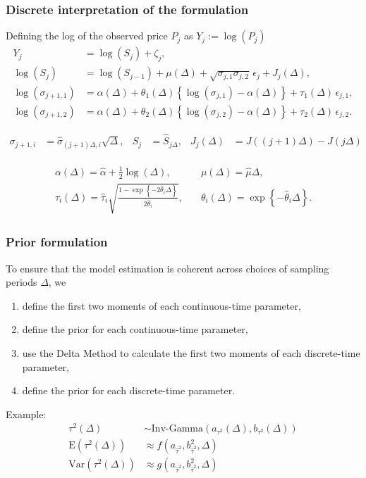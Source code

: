 \documentclass{beamer}
\newcommand{\halpha}{\hat{\alpha}}
\begin{document}
\begin{frame}
  \frametitle{Discrete interpretation of the formulation}
  Defining the log of the observed price $P_j$ as $Y_j := \log(P_j)$
  \begin{align*}
    Y_j &= \log(S_j) + \zeta_j  ,\\
    \log(S_{j}) &= \log(S_{j-1}) + \mu(\Delta) + \sqrt{\sigma_{j,1}\sigma_{j,2}} \, \epsilon_{j} + J_j(\Delta)   ,  \\
    \log(\sigma_{j+1,1}) &= \alpha(\Delta) + \theta_1(\Delta) \left\{ \log(\sigma_{j,1}) - \alpha(\Delta) \right\} + \tau_1(\Delta) \, \epsilon_{j,1}    ,  \\
    \log(\sigma_{j+1,2}) &= \alpha(\Delta) + \theta_2(\Delta) \left\{ \log(\sigma_{j,2}) - \alpha(\Delta) \right\} + \tau_2(\Delta) \, \epsilon_{j,2}.
  \end{align*}

  \begin{align*}
  \sigma_{j+1,i} &= \hat{\sigma}_{(j+1)\Delta,i}\sqrt{\Delta}, & S_j &= \hat{S}_{j\Delta}, & J_j(\Delta) &= J((j+1)\Delta) - J(j\Delta)
  \end{align*}
  
\begin{align*}
  \begin{split}
    \alpha(\Delta) = \halpha + \frac{1}{2}\log(\Delta),\quad  & 
    \mu(\Delta) = \hat{\mu} \Delta,      \\
    \tau_i(\Delta) = \hat{\tau}_i \sqrt{ \frac{1 - \exp \left\{
          -2\hat{\theta}_i \Delta \right\}}{2\hat{\theta}_i } },\quad & \theta_i(\Delta) =
    \exp\left\{
      -\hat{\theta}_i \Delta \right\}.
    \end{split}
\end{align*}
\end{frame}
\begin{frame}
  \frametitle{Prior formulation} To ensure that the model estimation
  is coherent across choices of sampling periods $\Delta$, we
  
  \begin{enumerate}
  \item define the first two moments of each continuous-time parameter,
  \item define the prior for each continuous-time parameter,
  \item use the Delta Method to calculate the first two moments of each discrete-time parameter,
  \item define the prior for each discrete-time parameter.
  \end{enumerate}

  Example:
  \begin{align}
    \tau^2(\Delta) &\sim \mbox{Inv-Gamma}\left(  a_{\tau^2}(\Delta), b_{\tau^2}(\Delta) \right) \\
    \mbox{E}(\tau^2(\Delta)) &\approx f(a_{\hat{\tau}^2}, b^2_{\hat{\tau}^2}, \Delta) \\
    \mbox{Var}(\tau^2(\Delta)) &\approx g(a_{\hat{\tau}^2}, b^2_{\hat{\tau}^2}, \Delta)
  \end{align}
\end{frame}
\end{document}
